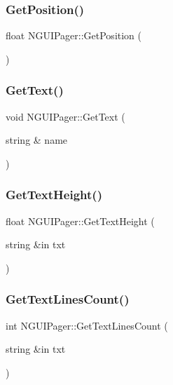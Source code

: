 \subsubsection{\texorpdfstring{Get\+Position()}{GetPosition()}}
{\footnotesize\ttfamily float N\+G\+U\+I\+Pager\+::\+Get\+Position (\begin{DoxyParamCaption}{ }\end{DoxyParamCaption})}

\hypertarget{class_n_g_u_i_pager_ae062a9a6a38f500d6b2178141d4db2fd}{}\label{class_n_g_u_i_pager_ae062a9a6a38f500d6b2178141d4db2fd} 
\subsubsection{\texorpdfstring{Get\+Text()}{GetText()}}
{\footnotesize\ttfamily void N\+G\+U\+I\+Pager\+::\+Get\+Text (\begin{DoxyParamCaption}\item[{string \&}]{name }\end{DoxyParamCaption})}

\hypertarget{class_n_g_u_i_pager_a485c63ded86931a1355ab6985d0ee100}{}\label{class_n_g_u_i_pager_a485c63ded86931a1355ab6985d0ee100} 
\subsubsection{\texorpdfstring{Get\+Text\+Height()}{GetTextHeight()}}
{\footnotesize\ttfamily float N\+G\+U\+I\+Pager\+::\+Get\+Text\+Height (\begin{DoxyParamCaption}\item[{string \&in}]{txt }\end{DoxyParamCaption})}

\hypertarget{class_n_g_u_i_pager_a0a278daabd4077ab0579ea0a8b64ef53}{}\label{class_n_g_u_i_pager_a0a278daabd4077ab0579ea0a8b64ef53} 
\subsubsection{\texorpdfstring{Get\+Text\+Lines\+Count()}{GetTextLinesCount()}}
{\footnotesize\ttfamily int N\+G\+U\+I\+Pager\+::\+Get\+Text\+Lines\+Count (\begin{DoxyParamCaption}\item[{string \&in}]{txt }\end{DoxyParamCaption})}

